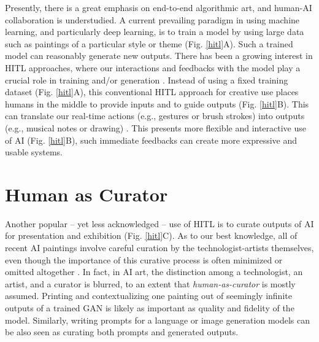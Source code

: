 \documentclass[letterpaper]{article} %
\begin{document}
Presently, there is a great emphasis on end-to-end algorithmic art, and human-AI collaboration is understudied. A current prevailing paradigm in using machine learning, and particularly deep learning, is to train a model by using large data such as paintings of a particular style or theme (Fig. \ref{hitl}A). Such a trained model can reasonably generate new outputs. There has been a growing interest in HITL approaches, where our interactions and feedbacks with the model play a crucial role in training and/or generation \cite{HITLML}. Instead of using a fixed training dataset (Fig. \ref{hitl}A), this conventional HITL approach for creative use places humans in the middle to provide inputs and to guide outputs (Fig. \ref{hitl}B). This can translate our real-time actions (e.g., gestures or brush strokes) into outputs (e.g., musical notes or drawing) \cite{Fiebrink2009}. This presents more flexible and interactive use of AI (Fig. \ref{hitl}B), such immediate feedbacks can create more expressive and usable systems.

\section{Human as Curator}

Another popular -- yet less acknowledged -- use of HITL is to curate outputs of AI for presentation and exhibition (Fig. \ref{hitl}C). As to our best knowledge, all of recent AI paintings involve careful curation by the technologist-artists themselves, even though the importance of this curative process is often minimized or omitted altogether \cite[e.g.][]{GANEdmondBelamy, Elgammal2017}. In fact, in AI art, the distinction among a technologist, an artist, and a curator is blurred, to an extent that \emph{human-as-curator} is mostly assumed. Printing and contextualizing one painting out of seemingly infinite outputs of a trained GAN is likely as important as quality and fidelity of the model. Similarly, writing prompts for a language or image generation models can be also seen as curating both prompts and generated outputs. 
\end{document}
